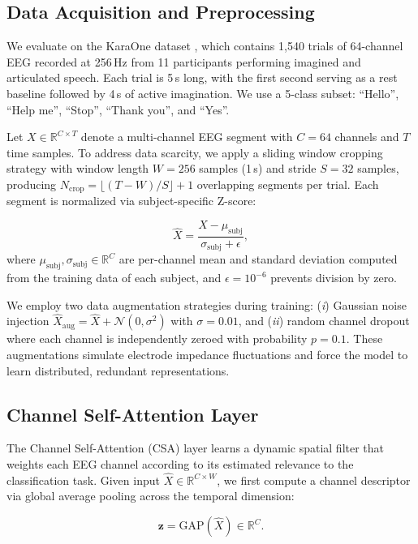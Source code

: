 \documentclass[conference]{IEEEtran}
\begin{document}
\subsection{Data Acquisition and Preprocessing}
We evaluate on the KaraOne dataset \cite{zhao2015karaone}, which contains 1,540 trials of 64-channel EEG recorded at 256\,Hz from 11 participants performing imagined and articulated speech. Each trial is 5\,s long, with the first second serving as a rest baseline followed by 4\,s of active imagination. We use a 5-class subset: ``Hello'', ``Help me'', ``Stop'', ``Thank you'', and ``Yes''.

Let $X \in \mathbb{R}^{C \times T}$ denote a multi-channel EEG segment with $C = 64$ channels and $T$ time samples. To address data scarcity, we apply a sliding window cropping strategy with window length $W = 256$ samples (1\,s) and stride $S = 32$ samples, producing $N_{\text{crop}} = \lfloor (T - W) / S \rfloor + 1$ overlapping segments per trial. Each segment is normalized via subject-specific Z-score:

\begin{equation}
	\hat{X} = \frac{X - \mu_{\text{subj}}}{\sigma_{\text{subj}} + \epsilon},
\end{equation}
where $\mu_{\text{subj}}, \sigma_{\text{subj}} \in \mathbb{R}^{C}$ are per-channel mean and standard deviation computed from the training data of each subject, and $\epsilon = 10^{-6}$ prevents division by zero.

We employ two data augmentation strategies during training: (\textit{i}) Gaussian noise injection $\hat{X}_{\text{aug}} = \hat{X} + \mathcal{N}(0, \sigma^2)$ with $\sigma = 0.01$, and (\textit{ii}) random channel dropout where each channel is independently zeroed with probability $p = 0.1$. These augmentations simulate electrode impedance fluctuations and force the model to learn distributed, redundant representations.

\subsection{Channel Self-Attention Layer}
The Channel Self-Attention (CSA) layer learns a dynamic spatial filter that weights each EEG channel according to its estimated relevance to the classification task. Given input $\hat{X} \in \mathbb{R}^{C \times W}$, we first compute a channel descriptor via global average pooling across the temporal dimension:

\begin{equation}
	\mathbf{z} = \text{GAP}(\hat{X}) \in \mathbb{R}^{C}.
\end{equation}
\end{document}
